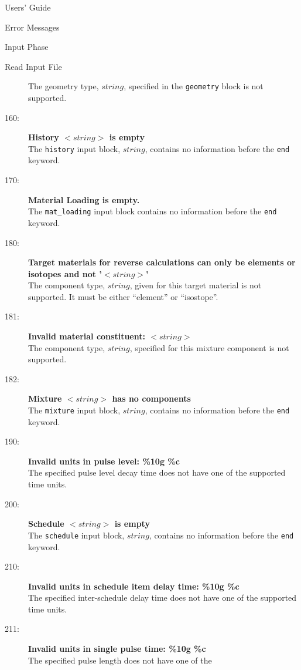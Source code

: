 \begin{chapter}{Users' Guide\label{app:user.guide}}
\begin{section}{Error Messages}
\begin{subsection}{Input Phase}
\begin{subsubsection}{Read Input File}
\begin{description}
          The geometry type, $string$, specified in the \texttt{geometry}
          block is not supported.
        \item[160:]\textbf{History $<\!\!string\!\!>$ is empty} \ \\
          The \texttt{history} input block, $string$, contains no
          information before the \texttt{end} keyword.
        \item[170:]\textbf{Material Loading is empty.}\ \\
          The \texttt{mat\_loading} input block contains no information
          before the \texttt{end} keyword.
        \item[180:]\textbf{Target materials for reverse calculations can only be
            elements or isotopes and not '$<\!\!string\!\!>$'}\ \\
          The component type, $string$, given for this target material
          is not supported.  It must be either ``element'' or ``isostope''.
        \item[181:]\textbf{Invalid material constituent:
            $<\!\!string\!\!>$}\ \\
          The component type, $string$, specified for this mixture
          component is not supported.
        \item[182:]\textbf{Mixture $<\!\!string\!\!>$ has no
            components}\ \\
          The \texttt{mixture} input block, $string$, contains no
          information before the \texttt{end} keyword.
        \item[190:]\textbf{Invalid units in pulse level: \%10g \%c}\
          \\
          The specified pulse level decay time does not have one of
          the supported time units.
        \item[200:]\textbf{Schedule $<\!\!string\!\!>$ is empty} \ 
          \\
          The \texttt{schedule} input block, $string$, contains no
          information before the \texttt{end} keyword.
        \item[210:]\textbf{Invalid units in schedule item delay
            time:  \%10g \%c}\ \\
          The specified inter-schedule delay time does not have one
          of the supported time units.
        \item[211:]\textbf{Invalid units in single pulse time: \%10g \%c}\ \\
          The specified pulse length does not have one of the

\end{description}
\end{subsubsection}
\end{subsection}
\end{section}
\end{chapter}
